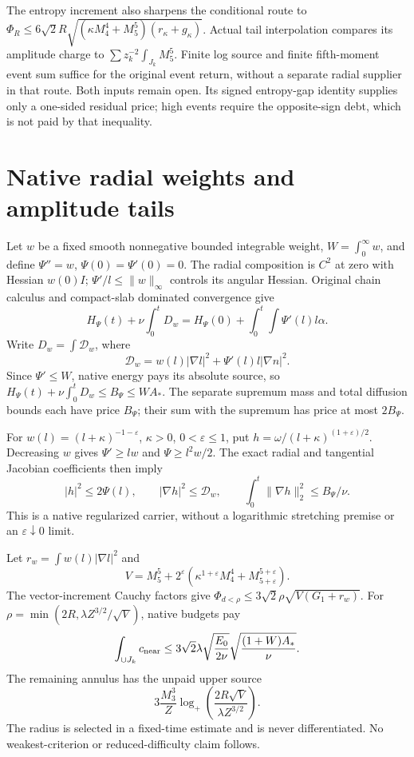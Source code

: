 \documentclass[11pt]{article}
\begin{document}
The entropy increment also sharpens the conditional route to
$\Phi_R\le6\sqrt2R\sqrt{(\kappa M_4^4+M_5^5)(r_\kappa+g_\kappa)}$.
Actual tail interpolation compares its amplitude charge to
$\sum z_k^{-2}\int_{J_k}M_5^5$. Finite log source and finite fifth-moment
event sum suffice for the original event return, without a separate radial
supplier in that route. Both inputs remain open. Its signed entropy-gap
identity supplies only a one-sided residual price; high events require the
opposite-sign debt, which is not paid by that inequality.

\section{Native radial weights and amplitude tails}
Let $w$ be a fixed smooth nonnegative bounded integrable weight,
$W=\int_0^\infty w$, and define $\Psi''=w$, $\Psi(0)=\Psi'(0)=0$.
The radial composition is $C^2$ at zero with Hessian $w(0)I$;
$\Psi'/l\le\|w\|_\infty$ controls its angular Hessian.
Original chain calculus and compact-slab dominated convergence give
\[
 H_\Psi(t)+\nu\int_0^t D_w
 =H_\Psi(0)+\int_0^t\!\int\Psi'(l)l\alpha.
\]
Write $D_w=\int\mathcal D_w$, where
\[
 \mathcal D_w=w(l)|\nabla l|^2+\Psi'(l)l|\nabla n|^2.
\]
Since $\Psi'\le W$, native energy pays its absolute source, so
$H_\Psi(t)+\nu\int_0^tD_w\le B_\Psi\le WA_*$.
The separate supremum mass and total diffusion bounds each have price
$B_\Psi$; their sum with the supremum has price at most $2B_\Psi$.

For $w(l)=(l+\kappa)^{-1-\varepsilon}$, $\kappa>0$,
$0<\varepsilon\le1$, put
$h=\omega/(l+\kappa)^{(1+\varepsilon)/2}$.
Decreasing $w$ gives $\Psi'\ge lw$ and $\Psi\ge l^2w/2$.
The exact radial and tangential Jacobian coefficients then imply
\[
 |h|^2\le2\Psi(l),\qquad |\nabla h|^2\le\mathcal D_w,
 \qquad \int_0^t\|\nabla h\|_2^2\le B_\Psi/\nu.
\]
This is a native regularized carrier, without a logarithmic stretching
premise or an $\varepsilon\downarrow0$ limit.

Let $r_w=\int w(l)|\nabla l|^2$ and
\[
 V=M_5^5+2^\varepsilon
       (\kappa^{1+\varepsilon}M_4^4+M_{5+\varepsilon}^{5+\varepsilon}).
\]
The vector-increment Cauchy factors give
$\Phi_{d<\rho}\le3\sqrt2\rho\sqrt{V(G_1+r_w)}$.
For $\rho=\min(2R,\lambda Z^{3/2}/\sqrt V)$, native budgets pay
\[
 \int_{\cup J_k}c_{\rm near}
 \le3\sqrt2\lambda\sqrt{\frac{E_0}{2\nu}}
                         \sqrt{\frac{(1+W)A_*}{\nu}}.
\]
The remaining annulus has the unpaid upper source
\[
 3\frac{M_3^3}{Z}\log_+\!\left(\frac{2R\sqrt V}{\lambda Z^{3/2}}\right).
\]
The radius is selected in a fixed-time estimate and is never differentiated.
No weakest-criterion or reduced-difficulty claim follows.
\end{document}
